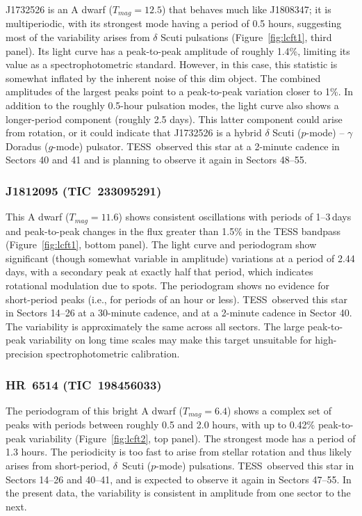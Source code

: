 \documentclass[twocolumn, linenumbers]{aastex631}
\newcommand{\tess}{TESS}
\begin{document}
J1732526 is an A dwarf ($T_{mag}=12.5$) that behaves much like J1808347; it is multiperiodic, with its strongest mode having a period of 0.5 hours, suggesting most of the variability arises from $\delta$ Scuti pulsations (Figure~\ref{fig:lcft1}, third panel). Its light curve has a peak-to-peak amplitude of roughly 1.4\%, limiting its value as a spectrophotometric standard. However, in this case, this statistic is somewhat inflated by the inherent noise of this dim object. The combined amplitudes of the largest peaks point to a peak-to-peak variation closer to 1\%.  In addition to the roughly 0.5-hour pulsation modes, the light curve also shows a longer-period component (roughly 2.5 days). This latter component could arise from rotation, or it could indicate that J1732526 is a hybrid $\delta$ Scuti ($p$-mode) -- $\gamma$ Doradus ($g$-mode) pulsator. \tess\ observed this star at a 2-minute cadence in Sectors 40 and 41 and is planning to observe it again in Sectors 48--55.


\subsubsection{J1812095 (TIC~233095291)}

This A dwarf ($T_{mag}=11.6$) shows consistent oscillations with periods of 1--3\,days and peak-to-peak changes in the flux greater than 1.5\% in the TESS bandpass (Figure~\ref{fig:lcft1}, bottom panel).  The light curve and periodogram show significant (though somewhat variable in amplitude) variations at a period of 2.44 days, with a secondary peak at exactly half that period, which indicates rotational modulation due to spots.  The periodogram shows no evidence for short-period peaks (i.e., for periods of an hour or less).  \tess\ observed this star in Sectors 14--26 at a 30-minute cadence, and at a 2-minute cadence in Sector 40.  The variability is approximately the same across all sectors. The large peak-to-peak variability on long time scales may make this target unsuitable for high-precision spectrophotometric calibration.

\subsubsection{HR~6514 (TIC~198456033)} %

The periodogram of this bright A dwarf ($T_{mag}=6.4$) shows a complex set of peaks with periods between roughly 0.5 and 2.0 hours, with up to 0.42\% peak-to-peak variability (Figure~\ref{fig:lcft2}, top panel).  The strongest mode has a period of 1.3 hours.  The periodicity is too fast to arise from stellar rotation and thus likely arises from short-period, $\delta$~Scuti ($p$-mode) pulsations.  \tess\ observed this star in Sectors 14--26 and 40--41, and is expected to observe it again in Sectors 47--55.  In the present data, the variability is consistent in amplitude from one sector to the next. 
\end{document}
